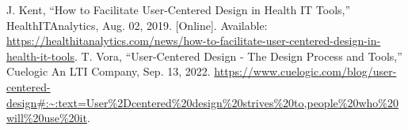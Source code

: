 \usepackage{hyperref} 

\begin{flushleft} 
  \begin{thebibliography}{00} 
     J. Kent, “How to Facilitate User-Centered Design in Health IT Tools,” HealthITAnalytics, Aug. 02, 2019. [Online]. Available: \url{https://healthitanalytics.com/news/how-to-facilitate-user-centered-design-in-health-it-tools}.     
      T. Vora, “User-Centered Design - The Design Process and Tools,” Cuelogic An LTI Company, Sep. 13, 2022.     \url{https://www.cuelogic.com/blog/user-centered-design#:~:text=User\%2Dcentered\%20design\%20strives\%20to,people\%20who\%20will\%20use\%20it}. 
    \end{thebibliography} 
 \end{flushleft}
